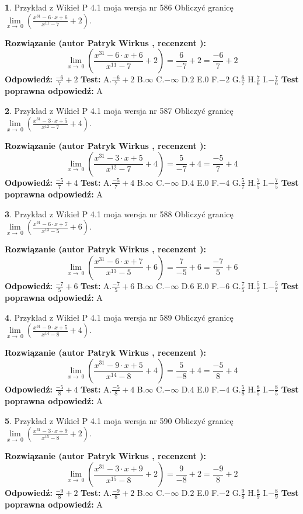 \documentclass[12pt, a4paper]{article}
\theoremstyle{definition} %
\newtheorem{zad}{}
\newcommand{\zadStart}[1]{\begin{zad}#1\newline}
\newcommand{\zadStop}{\end{zad}}
\newcommand{\rozwStart}[2]{\noindent \textbf{Rozwiązanie (autor #1 , recenzent #2): }\newline}
\newcommand{\rozwStop}{\newline}
\newcommand{\odpStart}{\noindent \textbf{Odpowiedź:}\newline}
\newcommand{\odpStop}{\newline}
\newcommand{\testStart}{\noindent \textbf{Test:}\newline}
\newcommand{\testStop}{\newline}
\newcommand{\kluczStart}{\noindent \textbf{Test poprawna odpowiedź:}\newline}
\newcommand{\kluczStop}{\newline}
\begin{document}
\zadStart{Przykład z Wikieł P 4.1 moja wersja nr 586}
Obliczyć granicę $\lim\limits_{x\to\ 0}(\frac{x^{31}-6 \cdot x +6}{x^{11}-7}+2)$.
\zadStop
\rozwStart{Patryk Wirkus}{}
$$\lim\limits_{x\to\ 0}(\frac{x^{31}-6 \cdot x +6}{x^{11}-7}+2)=\frac{6}{-7}+2=\frac{-6}{7}+2$$
\rozwStop
\odpStart
$\frac{-6}{7}+2$
\odpStop
\testStart
A.$\frac{-6}{7}+2$
B.$\infty$
C.$-\infty$
D.$2$
E.$0$
F.$-2$
G.$\frac{6}{7}$
H.$\frac{7}{6}$
I.$-\frac{7}{6}$
\testStop
\kluczStart
A
\kluczStop



\zadStart{Przykład z Wikieł P 4.1 moja wersja nr 587}
Obliczyć granicę $\lim\limits_{x\to\ 0}(\frac{x^{31}-3 \cdot x +5}{x^{12}-7}+4)$.
\zadStop
\rozwStart{Patryk Wirkus}{}
$$\lim\limits_{x\to\ 0}(\frac{x^{31}-3 \cdot x +5}{x^{12}-7}+4)=\frac{5}{-7}+4=\frac{-5}{7}+4$$
\rozwStop
\odpStart
$\frac{-5}{7}+4$
\odpStop
\testStart
A.$\frac{-5}{7}+4$
B.$\infty$
C.$-\infty$
D.$4$
E.$0$
F.$-4$
G.$\frac{5}{7}$
H.$\frac{7}{5}$
I.$-\frac{7}{5}$
\testStop
\kluczStart
A
\kluczStop



\zadStart{Przykład z Wikieł P 4.1 moja wersja nr 588}
Obliczyć granicę $\lim\limits_{x\to\ 0}(\frac{x^{31}-6 \cdot x +7}{x^{13}-5}+6)$.
\zadStop
\rozwStart{Patryk Wirkus}{}
$$\lim\limits_{x\to\ 0}(\frac{x^{31}-6 \cdot x +7}{x^{13}-5}+6)=\frac{7}{-5}+6=\frac{-7}{5}+6$$
\rozwStop
\odpStart
$\frac{-7}{5}+6$
\odpStop
\testStart
A.$\frac{-7}{5}+6$
B.$\infty$
C.$-\infty$
D.$6$
E.$0$
F.$-6$
G.$\frac{7}{5}$
H.$\frac{5}{7}$
I.$-\frac{5}{7}$
\testStop
\kluczStart
A
\kluczStop



\zadStart{Przykład z Wikieł P 4.1 moja wersja nr 589}
Obliczyć granicę $\lim\limits_{x\to\ 0}(\frac{x^{31}-9 \cdot x +5}{x^{14}-8}+4)$.
\zadStop
\rozwStart{Patryk Wirkus}{}
$$\lim\limits_{x\to\ 0}(\frac{x^{31}-9 \cdot x +5}{x^{14}-8}+4)=\frac{5}{-8}+4=\frac{-5}{8}+4$$
\rozwStop
\odpStart
$\frac{-5}{8}+4$
\odpStop
\testStart
A.$\frac{-5}{8}+4$
B.$\infty$
C.$-\infty$
D.$4$
E.$0$
F.$-4$
G.$\frac{5}{8}$
H.$\frac{8}{5}$
I.$-\frac{8}{5}$
\testStop
\kluczStart
A
\kluczStop



\zadStart{Przykład z Wikieł P 4.1 moja wersja nr 590}
Obliczyć granicę $\lim\limits_{x\to\ 0}(\frac{x^{31}-3 \cdot x +9}{x^{15}-8}+2)$.
\zadStop
\rozwStart{Patryk Wirkus}{}
$$\lim\limits_{x\to\ 0}(\frac{x^{31}-3 \cdot x +9}{x^{15}-8}+2)=\frac{9}{-8}+2=\frac{-9}{8}+2$$
\rozwStop
\odpStart
$\frac{-9}{8}+2$
\odpStop
\testStart
A.$\frac{-9}{8}+2$
B.$\infty$
C.$-\infty$
D.$2$
E.$0$
F.$-2$
G.$\frac{9}{8}$
H.$\frac{8}{9}$
I.$-\frac{8}{9}$
\testStop
\kluczStart
A
\kluczStop
\end{document}
